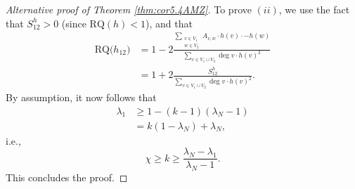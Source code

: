 \documentclass[10pt,a4paper]{amsart}
\newcommand{\RQ}{\textrm{RQ}}
\begin{document}
\begin{proof}[Alternative proof of Theorem \ref{thm:cor5.4AMZ}]
    To prove $(ii)$, we use the fact that $S_{12}^h>0$ (since $\RQ(h)<1$), and that
    \begin{align*}
        \RQ\bigl(h_{12}\bigr) &= 1 -2\frac{\sum_{\substack{v\in V_1\\ w\in V_2}}A_{v,w}\cdot h(v)\cdot -h(w)}{\sum_{v\in V_1\cup V_2}\deg v\cdot h(v)^2}\\
        &= 1+2\frac{S_{12}^h}{\sum_{v\in V_1\cup V_2}\deg v\cdot h(v)^2}.
    \end{align*}
    By assumption, it now follows that
    \begin{equation*}
    \begin{aligned}
        \lambda_1&\geq 1-( k-1)(\lambda_N-1) \\
        &=  k(1-\lambda_N)+\lambda_N,
    \end{aligned}
    \end{equation*}
    i.e.,
    \begin{equation}\label{eq:inequality2.2}
        \chi \geq k \geq \frac{\lambda_N-\lambda_1}{\lambda_N-1}.
    \end{equation}
    This concludes the proof.
\end{proof}
\end{document}
